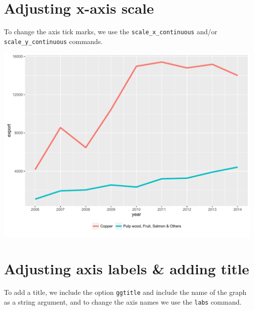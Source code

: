 \section{Adjusting x-axis scale}\label{adjusting-x-axis-scale}

To change the axis tick marks, we use the \texttt{scale\_x\_continuous}
and/or \texttt{scale\_y\_continuous} commands.

\begin{Shaded}
\begin{Highlighting}[]
\StringTok{ }\StringTok{ }\NormalTok{(}\NormalTok{(}\NormalTok{,}\NormalTok{,}\NormalTok{))}
\end{Highlighting}
\end{Shaded}

\begin{center}\includegraphics[width=0.55\linewidth]{figures/line_4-1} \end{center}

\section{Adjusting axis labels \& adding
title}\label{adjusting-axis-labels-adding-title}

To add a title, we include the option \texttt{ggtitle} and include the
name of the graph as a string argument, and to change the axis names we
use the \texttt{labs} command.

\begin{Shaded}
\begin{Highlighting}[]
\StringTok{ }\StringTok{ }\NormalTok{(}\NormalTok{) +}
\StringTok{      }\NormalTok{(}\NormalTok{, }\NormalTok{) }
\end{Highlighting}
\end{Shaded}


